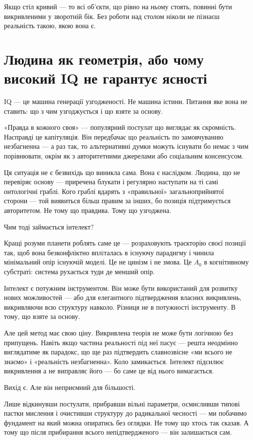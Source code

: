 \documentclass[12pt, a4paper, openany]{book}
\begin{document}
Якщо стіл кривий --- то всі об'єкти, що рівно на ньому стоять, повинні бути викривленими у зворотній бік. Без роботи над столом ніколи не пізнаєш реальність такою, якою вона є.


\chapter{Людина як геометрія, або чому високий IQ не гарантує ясності}

IQ --- це машина генерації узгодженості. Не машина істини. Питання яке вона не ставить: що з чим узгоджується і що взяте за основу.

«Правда в кожного своя» --- популярний постулат що виглядає як скромність. Насправді це капітуляція. Він передбачає що реальність по замовчуванню незбагненна --- а раз так, то альтернативні думки можуть існувати бо немає з чим порівнювати, окрім як з авторитетними джерелами або соціальним консенсусом.

Ця ситуація не є безвихідь що виникла сама. Вона є наслідком. Людина, що не перевіряє основу --- приречена блукати і регулярно наступати на ті самі онтологічні граблі. Кого граблі вдарять з «правильної» загальноприйнятої сторони --- той виявиться більш правим за інших, бо позиція підтримується авторитетом. Не тому що правдива. Тому що узгоджена.

Чим тоді займається інтелект?

Кращі розуми планети роблять саме це --- розраховують траєкторію своєї позиції так, щоб вона безконфліктно вплiталась в існуючу парадигму і чинила мінімальний опір існуючій моделі. Це не цинізм і не змова. Це $A_0$ в когнітивному субстраті: система рухається туди де менший опір.

Інтелект є потужним інструментом. Він може бути використаний для розвитку нових можливостей --- або для елегантного підтвердження власних викривлень, викривляючи всю структуру навколо. Різниця не в потужності інструменту. В тому, що взяте за основу.

Але цей метод має свою ціну. Викривлена теорія не може бути логічною без припущень. Навіть якщо частина реальності під неї пасує --- решта неодмінно виглядатиме як парадокс, що ще раз підтвердить славнозвісне «ми всього не знаємо» і «реальність незбагненна». Коло замикається. Інтелект підсилює викривлення а не виправляє його --- бо саме це від нього вимагається.

Вихід є. Але він неприємний для більшості.

Лише відкинувши постулати, прибравши вільні параметри, осмисливши типові пастки мислення і очистивши структуру до радикальної чесності --- ми побачимо фундамент на який можна опиратись без оглядки. Не тому що хтось так сказав. А тому що після прибирання всього непідтвердженого --- він залишається сам.
\end{document}
